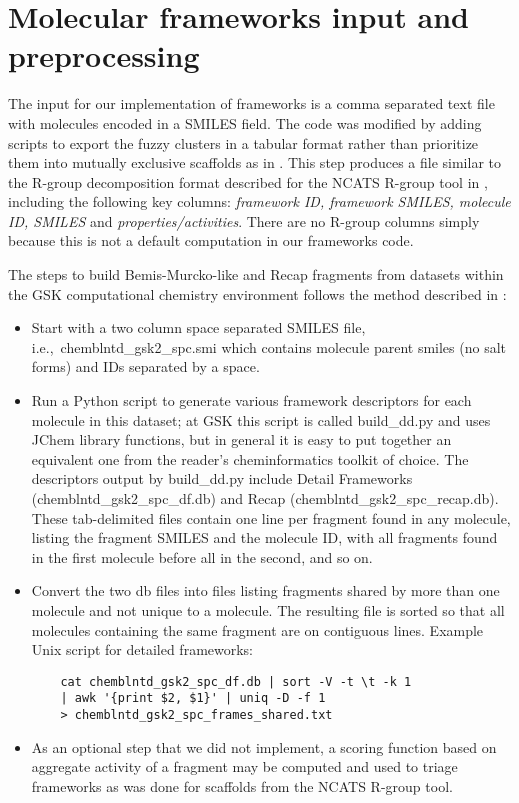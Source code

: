 \documentclass[11pt,letterpaper]{article}
\newcommand*\ie{i.e.,~}
\begin{document}
\newpage 

\section{Molecular frameworks input and preprocessing}
\label{sec:gskfw-prepro}
The input for our implementation of frameworks is a comma separated text file
with molecules encoded in a SMILES field.  The code was modified by
adding scripts to export the fuzzy clusters in a tabular format rather
than prioritize them into mutually exclusive scaffolds as in
\citet{Harper2004DDclus}. This step produces a file similar to
the R-group decomposition format described for the NCATS R-group tool
in , including the following key columns: \emph{framework
  ID, framework SMILES, molecule ID, SMILES} and
\emph{properties/activities}.  There are no R-group columns simply
because this is not a default computation in our frameworks code.

The steps to build Bemis-Murcko-like and Recap fragments from datasets within the GSK computational chemistry environment follows the method described in  \cite{Harper2004DDclus}:
\begin{itemize}
\item Start with a two column space separated SMILES file, \ie chemblntd\_gsk2\_spc.smi which contains molecule parent smiles (no salt forms) and IDs separated by a space. 
\item Run a Python script to generate various framework descriptors for each molecule in this dataset; at GSK this script is called build\_dd.py and uses {JChem} library functions, but in general it is easy to put together an equivalent one from the reader's cheminformatics toolkit of choice.  The descriptors output by build\_dd.py include Detail Frameworks (chemblntd\_gsk2\_spc\_df.db) and Recap (chemblntd\_gsk2\_spc\_recap.db). These tab-delimited files contain one line per fragment found in any molecule, listing the fragment SMILES and the molecule ID, with all fragments found in the first molecule before all in the second, and so on.
\item Convert the two db files into files listing fragments shared by more than one molecule and not unique to a molecule. The resulting file is sorted so that all molecules containing the same fragment are on contiguous lines. Example Unix script for detailed frameworks:
  \begin{verbatim}
    cat chemblntd_gsk2_spc_df.db | sort -V -t \t -k 1
    | awk '{print $2, $1}' | uniq -D -f 1
    > chemblntd_gsk2_spc_frames_shared.txt
  \end{verbatim}
\item As an optional step that we did not implement, a scoring function based on aggregate activity of a fragment may be computed and used to triage frameworks as was done for scaffolds from the NCATS R-group tool.   
    
\end{itemize}
\end{document}
